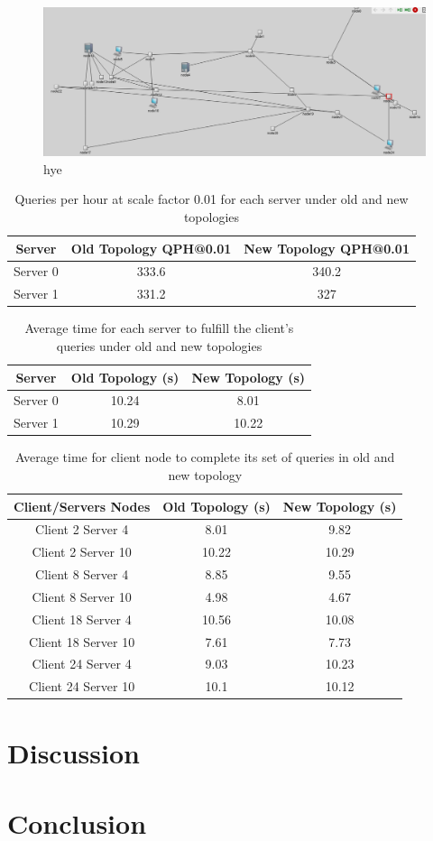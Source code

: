 \begin{figure}[tp]
\centering
\includegraphics[width=0.5 \textwidth]{figures/MultServerNew}
\caption{hye}
\end{figure}

\begin{table}[h!]
\centering
\begin{tabular}{|c|c|c|}
\hline
Server & Old Topology QPH@0.01 & New Topology QPH@0.01 \\ \hline
Server 0 & 333.6 & 340.2  \\ \hline
Server 1 & 331.2 & 327 \\ \hline
\end{tabular}
\caption{Queries per hour at scale factor 0.01 for each server under old and new topologies}
\label{tab:my_label}
\end{table}

\begin{table}[h!]
\centering
\begin{tabular}{|c|c|c|}
\hline
Server & Old Topology (s) & New Topology (s) \\ \hline
Server 0 & 10.24 & 8.01  \\ \hline
Server 1 & 10.29 & 10.22 \\ \hline
\end{tabular}
\caption{Average time for each server to fulfill the client's queries under old and new topologies}
\label{tab:my_label}
\end{table}


\begin{table}[h!]
\centering
\begin{tabular}{|c|c|c|}
\hline
Client/Servers Nodes & Old Topology (s) & New Topology (s) \\ \hline
Client 2 Server 4 & 8.01  & 9.82  \\ \hline
Client 2 Server 10 & 10.22 & 10.29 \\ \hline
Client 8 Server 4 & 8.85  & 9.55  \\ \hline
Client 8 Server 10 & 4.98  & 4.67  \\ \hline
Client 18 Server 4 & 10.56 & 10.08 \\ \hline
Client 18 Server 10 & 7.61  & 7.73  \\ \hline
Client 24 Server 4 & 9.03  & 10.23 \\ \hline
Client 24 Server 10 & 10.1  & 10.12 \\ \hline
\end{tabular}
\caption{Average time for client node to complete its set of queries in old and new topology}
\label{tab:my_label}
\end{table}


\section{Discussion}

\section{Conclusion}

